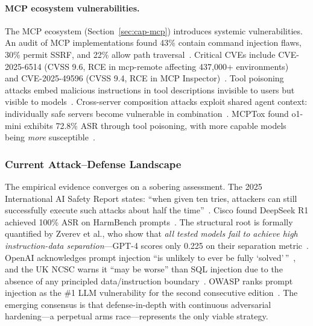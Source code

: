 \paragraph{MCP ecosystem vulnerabilities.}
The MCP ecosystem (Section~\ref{sec:cap-mcp}) introduces systemic vulnerabilities. An audit of MCP implementations found 43\% contain command injection flaws, 30\% permit SSRF, and 22\% allow path traversal~\cite{equixly2025mcp}. Critical CVEs include CVE-2025-6514 (CVSS 9.6, RCE in mcp-remote affecting 437,000+ environments)~\cite{jfrog2025mcpremote} and CVE-2025-49596 (CVSS 9.4, RCE in MCP Inspector)~\cite{oligo2025inspector}. Tool poisoning attacks embed malicious instructions in tool descriptions invisible to users but visible to models~\cite{invariant2025toolpoisoning}. Cross-server composition attacks exploit shared agent context: individually safe servers become vulnerable in combination~\cite{invariant2025whatsapp,croce2025trivial}. MCPTox found o1-mini exhibits 72.8\% ASR through tool poisoning, with more capable models being \emph{more} susceptible~\cite{wang2025mcptox}.


\subsubsection{Current Attack--Defense Landscape}
\label{sec:threat-landscape}

The empirical evidence converges on a sobering assessment. The 2025 International AI Safety Report states: ``when given ten tries, attackers can still successfully execute such attacks about half the time''~\cite{aisafetyreport2025}. Cisco found DeepSeek R1 achieved 100\% ASR on HarmBench prompts~\cite{cisco2025deepseek}. The structural root is formally quantified by Zverev et al., who show that \emph{all tested models fail to achieve high instruction-data separation}---GPT-4 scores only 0.225 on their separation metric~\cite{zverev2025separation}. OpenAI acknowledges prompt injection ``is unlikely to ever be fully `solved'\,''~\cite{openai2025atlas}, and the UK NCSC warns it ``may be worse'' than SQL injection due to the absence of any principled data/instruction boundary~\cite{ncsc2025promptinjection}. OWASP ranks prompt injection as the \#1 LLM vulnerability for the second consecutive edition~\cite{owasp2025}. The emerging consensus is that defense-in-depth with continuous adversarial hardening---a perpetual arms race---represents the only viable strategy.


